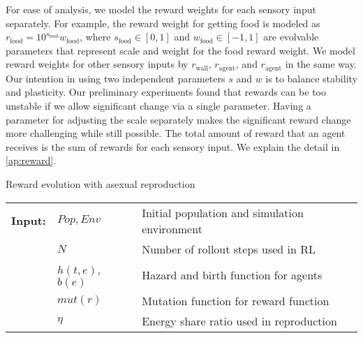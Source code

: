 For ease of analysis, we model the reward weights for each sensory input separately. For example, the reward weight for getting food is modeled as $r_{\mathrm{food}} = 10^{s_{\mathrm{food}}} w_{\mathrm{food}}$, where $s_{\mathrm{food}} \in [0, 1]$ and $w_{\mathrm{food}} \in [-1, 1]$ are evolvable parameters that represent scale and weight for the food reward weight. We model reward weights for other sensory inputs by $r_\mathrm{wall}$, $r_\mathrm{agent}$, and $r_\mathrm{agent}$ in the same way. Our intention in using two independent parameters $s$ and $w$ is to balance stability and plasticity. Our preliminary experiments found that rewards can be too unstable if we allow significant change via a single parameter. Having a parameter for adjusting the scale separately makes the significant reward change more challenging while still possible. The total amount of reward that an agent receives is the sum of rewards for each sensory input. We explain the detail in \cref{ap:reward}.

\begin{algorithm}
  \caption{Reward evolution with asexual reproduction}\label{alg:reward-evo}
  \begin{tabular}{lll}
    \textbf{Input:} & $Pop, Env$ & Initial population and simulation environment\\
                    & $N$ & Number of rollout steps used in RL \\
                    & $h(t, e)$, $b(e)$ & Hazard and birth function for agents \\
                    & $mut(r)$ & Mutation function for reward function \\
                    & $\eta$ & Energy share ratio used in reproduction
  \end{tabular}
  \begin{algorithmic}[1]
    \Loop{}
      \EndOnce{}
    \EndFor{}

      \EndWith{}
      \EndWith{}
    \EndFor{}
  \EndLoop{}
\end{algorithmic}
\end{algorithm}

